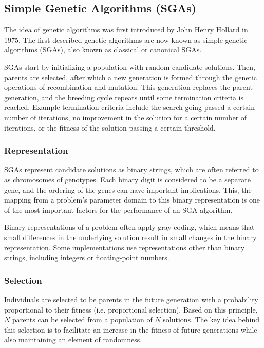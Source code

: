 \documentclass[12pt,titlepage]{article}
\begin{document}
    \subsection{Simple Genetic Algorithms (SGAs)}
      The idea of genetic algorithms was first introduced by John Henry Hollard in 1975. The first described genetic algorithms are now known as simple genetic algorithms (SGAs), also
      known as classical or canonical SGAs.

      SGAs start by initializing a population with random candidate solutions. Then, parents are selected, after which a new generation is formed through the genetic operations of
      recombination and mutation. This generation replaces the parent generation, and the breeding cycle repeats until some termination criteria is reached. Example termination
      criteria include the search going passed a certain number of iterations, no improvement in the solution for a certain number of iterations, or the fitness of the solution
      passing a certain threshold.

      \subsubsection{Representation}
        SGAs represent candidate solutions as binary strings, which are often referred to as chromosomes of genotypes. Each binary digit is considered to be a separate gene, and
        the ordering of the genes can have important implications. This, the mapping from a problem's parameter domain to this binary representation is one of the most important
        factors for the performance of an SGA algorithm.

        Binary representations of a problem often apply gray coding, which means that small differences in the underlying solution result in small changes in the binary
        representation. Some implementations use representations other than binary strings, including integers or floating-point numbers.

      \subsubsection{Selection}
        Individuals are selected to be parents in the future generation with a probability proportional to their fitness (i.e. proportional selection). Based on this principle,
        $N$ parents can be selected from a population of $N$ solutions. The key idea behind this selection is to facilitate an increase in the fitness of future generations while
        also maintaining an element of randomness.
\end{document}

